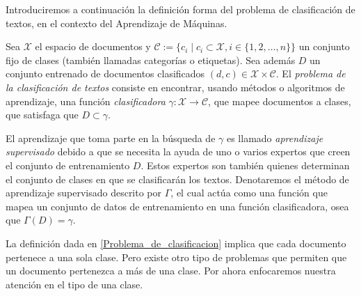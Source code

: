 \documentclass{llncs}
\begin{document}
	Introduciremos a continuaci\'on la definici\'on forma del problema de clasificaci\'on de textos, en el contexto del Aprendizaje de M\'aquinas.
	
	\begin{definition} \label{Problema_de_clasificacion}
		Sea $\mathcal{{X}}$ el espacio de documentos y $\mathcal{C} := \{c_i \mid c_i \subset \mathcal{X}, i \in \{ 1,2,\dots,n\} \}$ un conjunto fijo de clases (tambi\'en llamadas categor\'ias o etiquetas). Sea adem\'as $D$ un conjunto entrenado de documentos clasificados $(d,c) \in \mathcal X \times \mathcal{C}$. El \emph{problema de la clasificaci\'on de textos} consiste en encontrar, usando m\'etodos o algoritmos de aprendizaje, una funci\'on \emph{clasificadora} $\gamma : \mathcal{X} \rightarrow \mathcal{C}$, que mapee documentos a clases, que satisfaga que $D \subset \gamma$. 	

	\end{definition}
	
	El aprendizaje que toma parte en la b\'usqueda de $\gamma$ es llamado \emph{aprendizaje supervisado} debido a que se necesita la ayuda de uno o varios expertos que creen el conjunto de entrenamiento $D$. Estos expertos son  tambi\'en quienes determinan el conjunto de clases en que se clasificar\'an los textos. Denotaremos el m\'etodo de aprendizaje supervisado descrito por $\Gamma$, el cual act\'ua como una funci\'on que mapea un conjunto de datos de entrenamiento en una funci\'on clasificadora, osea que $\Gamma(D) = \gamma$.
	
	La definici\'on dada en \ref{Problema_de_clasificacion} implica que cada documento pertenece a una sola clase. Pero existe otro tipo de problemas que permiten que un documento pertenezca a m\'as de una clase. Por ahora enfocaremos nuestra atenci\'on en el tipo de una clase.
	
\end{document}
